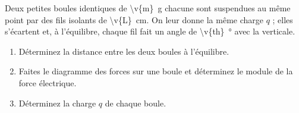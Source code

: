 Deux petites boules identiques de \qty{\v{m}}{g} chacune sont suspendues au même point par des fils isolants de \qty{\v{L}}{cm}. On leur donne la même charge $q$ ; elles s'écartent et, à l'équilibre, chaque fil fait un angle de \qty{\v{th}}{\degree} avec la verticale.

\begin{enumerate}[label=\alph*)]
    \item Déterminez la distance entre les deux boules à l'équilibre.
    \item Faites le diagramme des forces sur une boule et déterminez le module de la force électrique.
    \item Déterminez la charge $q$ de chaque boule.
\end{enumerate}
